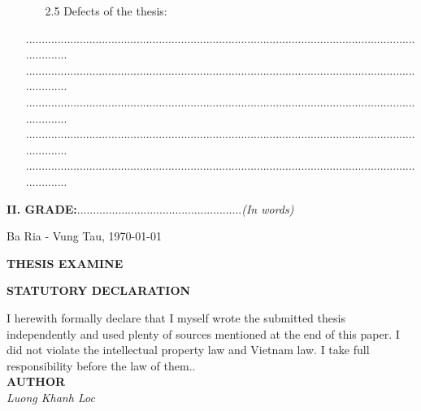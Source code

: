\documentclass[12pt,a4paper]{report}
\begin{document}
\begin{enumerate}
	\begin{enumerate}
		\item[2.5] Defects of the thesis:
	\end{enumerate}
	\item[] ........................................................................................................................................\\........................................................................................................................................\\........................................................................................................................................\\........................................................................................................................................\\........................................................................................................................................
\end{enumerate}
\textbf{II. GRADE:}....................................................\textit{(In words)}
\begin{flushright}
Ba Ria - Vung Tau, \today
\end{flushright}
\hspace{300pt} \textbf{THESIS EXAMINE}\\





\newpage

\begin{center}
	\centering
	\textbf{STATUTORY DECLARATION}
\end{center}
I herewith formally declare that I myself wrote the submitted thesis independently and used plenty of sources mentioned at the end of this paper. I did not violate the intellectual property law and Vietnam law. I take full responsibility before the law of them..\\
\newline
\hspace*{295pt} \textbf{AUTHOR}\\
\newline
\newline
\hspace*{282pt} \textit{Luong Khanh Loc}
\end{document}
